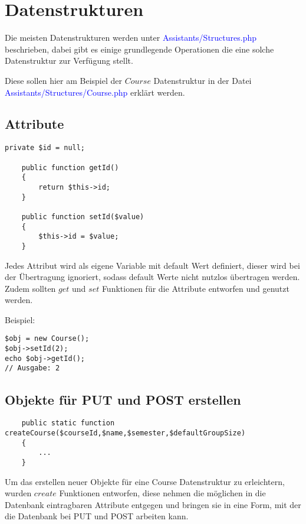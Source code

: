 \section{Datenstrukturen}
Die meisten Datenstrukturen werden unter
\textcolor{blue}{Assistants/Structures.php} beschrieben, dabei gibt es einige grundlegende Operationen die eine solche Datenstruktur zur Verfügung stellt.

Diese sollen hier am Beispiel der $Course$ Datenstruktur in der Datei \textcolor{blue}{Assistants/Structures/Course.php} erklärt werden.

\subsection{Attribute}
\begin{minipage}{\textwidth}
\begin{lstlisting}
private $id = null;

    public function getId()
    {
        return $this->id;
    }
    
    public function setId($value)
    {
        $this->id = $value;
    }
\end{lstlisting}
\end{minipage}

Jedes Attribut wird als eigene Variable mit default Wert definiert, dieser wird bei der Übertragung ignoriert, sodass default Werte nicht nutzlos übertragen werden. Zudem sollten $get$ und $set$ Funktionen für die Attribute entworfen und genutzt werden.

\begin{minipage}{\textwidth}
Beispiel:
\begin{lstlisting}
$obj = new Course();
$obj->setId(2);
echo $obj->getId();
// Ausgabe: 2
\end{lstlisting}
\end{minipage}

\subsection{Objekte für PUT und POST erstellen}
\begin{minipage}{\textwidth}
\begin{lstlisting}
    public static function createCourse($courseId,$name,$semester,$defaultGroupSize)
    {
    	...
    }
\end{lstlisting}
\end{minipage}

Um das erstellen neuer Objekte für eine Course Datenstruktur zu erleichtern, wurden $create$ Funktionen entworfen, diese nehmen die möglichen in die Datenbank eintragbaren Attribute entgegen und bringen sie in eine Form, mit der die Datenbank bei PUT und POST arbeiten kann.


